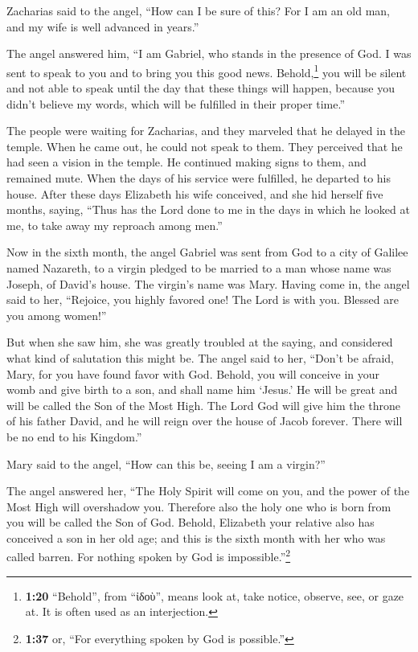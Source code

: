  Zacharias said to the angel, ``How can I be sure of
this? For I am an old man, and my wife is well advanced in years.''

 The angel answered him, ``I am Gabriel, who stands in
the presence of God. I was sent to speak to you and to bring you this
good news.  Behold,\footnote{\textbf{1:20} ``Behold'',
  from ``ἰδοὺ'', means look at, take notice, observe, see, or gaze at.
  It is often used as an interjection.} you will be silent and not able
to speak until the day that these things will happen, because you didn't
believe my words, which will be fulfilled in their proper time.''

 The people were waiting for Zacharias, and they marveled
that he delayed in the temple.  When he came out, he
could not speak to them. They perceived that he had seen a vision in the
temple. He continued making signs to them, and remained mute.
 When the days of his service were fulfilled, he departed
to his house.  After these days Elizabeth his wife
conceived, and she hid herself five months, saying, 
``Thus has the Lord done to me in the days in which he looked at me, to
take away my reproach among men.''

 Now in the sixth month, the angel Gabriel was sent from
God to a city of Galilee named Nazareth,  to a virgin
pledged to be married to a man whose name was Joseph, of David's house.
The virgin's name was Mary.  Having come in, the angel
said to her, ``Rejoice, you highly favored one! The Lord is with you.
Blessed are you among women!''

 But when she saw him, she was greatly troubled at the
saying, and considered what kind of salutation this might be.
 The angel said to her, ``Don't be afraid, Mary, for you
have found favor with God.  Behold, you will conceive in
your womb and give birth to a son, and shall name him `Jesus.'
 He will be great and will be called the Son of the Most
High. The Lord God will give him the throne of his father David,
 and he will reign over the house of Jacob forever. There
will be no end to his Kingdom.''

 Mary said to the angel, ``How can this be, seeing I am a
virgin?''

 The angel answered her, ``The Holy Spirit will come on
you, and the power of the Most High will overshadow you. Therefore also
the holy one who is born from you will be called the Son of God.
 Behold, Elizabeth your relative also has conceived a son
in her old age; and this is the sixth month with her who was called
barren.  For nothing spoken by God is
impossible.''\footnote{\textbf{1:37} or, ``For everything spoken by God
  is possible.''}

